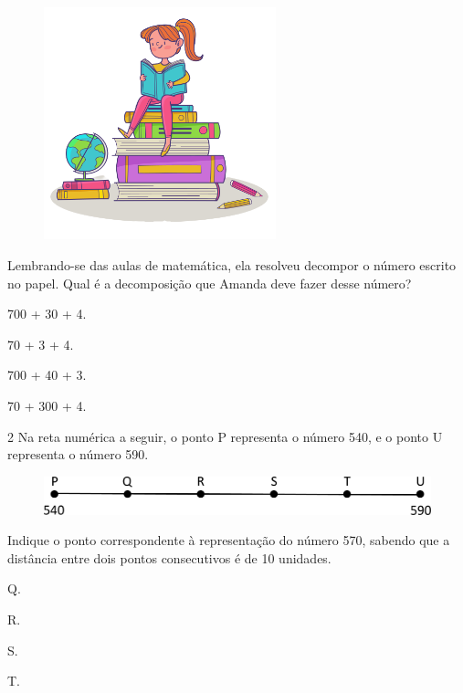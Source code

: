 \begin{figure}[htpb!]
\centering
\includegraphics[width=0.6\textwidth]{./media/image6b.png}
\end{figure}

Lembrando-se das aulas de matemática, ela resolveu decompor o número escrito
no papel. Qual é a decomposição que Amanda deve fazer desse
número?

\begin{escolha}
\item
  700 + 30 + 4.
\item
  70 + 3 + 4.
\item
  700 + 40 + 3.
\item
  70 + 300 + 4.
\end{escolha}

\pagebreak

\num{2} Na reta numérica a seguir, o ponto P representa o número 540, e o ponto U representa o número 590.

\begin{figure}[htpb!]
\centering
\includegraphics[width=\textwidth]{./media/image8.png}
\end{figure}

Indique o ponto correspondente à representação do número 570, sabendo que a
distância entre dois pontos consecutivos é de 10 unidades.

\begin{escolha}
  \begin{multicols}{2}
\item
  Q.
\item
  R.
\item
  S.
\item
  T.
  \end{multicols}
\end{escolha}

